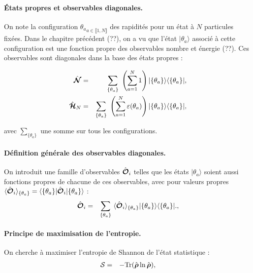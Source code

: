 \paragraph{États propres et observables diagonales.}
On note la configuration ${ \theta_a }_{a\in \llbracket 1 , N \rrbracket}$ des rapidités pour un état à $N$ particules fixées. Dans le chapitre précédent (??), on a vu que l'état $\vert { \theta_a } \rangle$ associé à cette configuration est une fonction propre des observables nombre et énergie (??). Ces observables sont diagonales dans la base des états propres :

\begin{eqnarray}
	\operator{\mathcal{N}} & = & \sum_{ \{\theta_a\} }   \left ( \sum_{a = 1}^N  1 \right )  \vert \{ \theta_a\}\rangle	\langle \{ \theta_a \}\vert,\\
	\operator{\mathcal{H}}_N & = & \sum_{\{ \theta_a\}}  \left ( \sum_{a = 1}^N  \varepsilon ( \theta_a ) \right )   \vert \{ \theta_a\}\rangle	\langle \{ \theta_a \}\vert,		
\end{eqnarray}

avec $ \sum_{\{ \theta_a\}}$ une somme sur tous les configurations.\\


\paragraph{Définition générale des observables diagonales.}
On introduit une famille d'observables $\hat{\bm{\mathcal{O}}}_i$ telles que les états $\vert { \theta_a } \rangle$ soient aussi fonctions propres de chacune de ces observables, avec pour valeurs propres $\langle \hat{\bm{\mathcal{O}}}_i \rangle_{\{\theta_a \}} = \langle \{ \theta_a \} \vert\hat{\bm{\mathcal{O}}}_i \vert \{ \theta_a \} \rangle$ :\\

\begin{eqnarray}
	\operator{\mathcal{O}}_i & = & \sum_{ \{\theta_a\} }   \langle \operator{\mathcal{O}}_i \rangle_{\{\theta_a \}}  \vert \{ \theta_a\}\rangle	\langle \{ \theta_a \}\vert.,		
\end{eqnarray}


\paragraph{Principe de maximisation de l'entropie.}
On cherche à maximiser l'entropie de Shannon de l’état statistique :
\begin{eqnarray}
	\mathcal{S} & = & -\mathrm{Tr} ( \hat{\bm{\rho}} \ln \hat{\bm{\rho}} ) , 	
\end{eqnarray}


